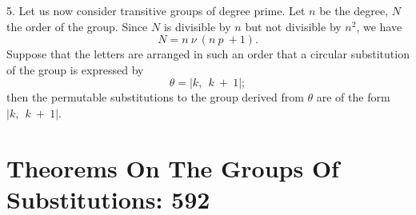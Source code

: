 \documentclass[11pt,fancy]{elegantbook}
\begin{document}
5.
Let us now consider transitive groups of degree prime. Let $n$ be the degree, $N$ the order of the group. Since $N$ is divisible by $n$ but not divisible by $n^2$, we have
\begin{equation}
    N=n \ \nu \ (n \ p \ + 1).
\end{equation}
Suppose that the letters are arranged in such an order that a circular substitution of the group is expressed by 
\begin{equation}
    \theta=|k, \ \ {k \ + \ 1}|;
\end{equation}
then the permutable substitutions to the group derived from $\theta$ are of the form $|k, \ \ {k \ + \ 1}|$.


\section{Theorems On The Groups Of Substitutions: 592}
\end{document}
